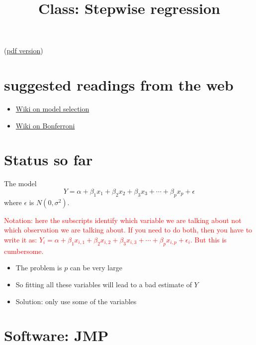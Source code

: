 \documentclass{article}
\begin{document}
\title{Class: Stepwise regression}
\maketitle

(\href{class_stepwise_regression.pdf}{pdf version})

\section{suggested readings from the web}
\begin{itemize}
\item \href{http://en.wikipedia.org/wiki/Model_selection}{Wiki on
model selection}
\item \href{http://en.wikipedia.org/wiki/Bonferroni_correction}{Wiki
on Bonferroni}
\end{itemize}

\section{Status so far}

The model
\begin{displaymath}
Y = \alpha + \beta_1 x_1 + \beta_2 x_2 + \beta_3 x_3 + \cdots + \beta_p
x_p + \epsilon
\end{displaymath}
where $\epsilon$ is $N(0,\sigma^2)$.  

\textcolor{red}{{Notation: here the subscripts identify which variable we are
 talking about not which observation we are talking about.  If you
 need to do both, then you have to write it as: $Y_i = \alpha +
 \beta_1 x_{i,1} + \beta_2 x_{i,2} + \beta_3 x_{i,3} + \cdots + \beta_p
 x_{i,p} + \epsilon_i$.  But this is cumbersome.}}

\begin{itemize}
\item The problem is $p$ can be very large
\item So fitting all these variables will lead to a bad estimate of $Y$
\item Solution: only use some of the variables
\end{itemize}

\section{Software: JMP}
\end{document}
